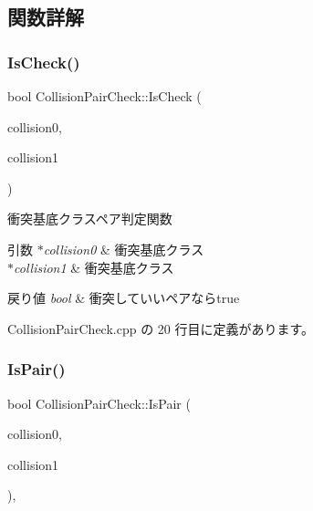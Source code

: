 \subsection{関数詳解}
\mbox{\label{class_collision_pair_check_aa7603c32ae782ad890280d360ae19dfe}} 
\subsubsection{\texorpdfstring{Is\+Check()}{IsCheck()}}
{\footnotesize\ttfamily bool Collision\+Pair\+Check\+::\+Is\+Check (\begin{DoxyParamCaption}\item[{\mbox{\hyperlink{class_collision_base}{Collision\+Base}} $\ast$}]{collision0,  }\item[{\mbox{\hyperlink{class_collision_base}{Collision\+Base}} $\ast$}]{collision1 }\end{DoxyParamCaption})\hspace{0.3cm}{\ttfamily [static]}}



衝突基底クラスペア判定関数 


\begin{DoxyParams}{引数}
{\em $\ast$collision0} & 衝突基底クラス \\
\hline
{\em $\ast$collision1} & 衝突基底クラス \\
\hline
\end{DoxyParams}

\begin{DoxyRetVals}{戻り値}
{\em bool} & 衝突していいペアならtrue \\
\hline
\end{DoxyRetVals}


 Collision\+Pair\+Check.\+cpp の 20 行目に定義があります。

\mbox{\label{class_collision_pair_check_a52eefe9e5b104075d4c812ca9b68ff16}} 
\subsubsection{\texorpdfstring{Is\+Pair()}{IsPair()}}
{\footnotesize\ttfamily bool Collision\+Pair\+Check\+::\+Is\+Pair (\begin{DoxyParamCaption}\item[{\mbox{\hyperlink{class_collision_base}{Collision\+Base}} $\ast$}]{collision0,  }\item[{\mbox{\hyperlink{class_collision_base}{Collision\+Base}} $\ast$}]{collision1 }\end{DoxyParamCaption})\hspace{0.3cm}{\ttfamily [static]}, {\ttfamily [private]}}



